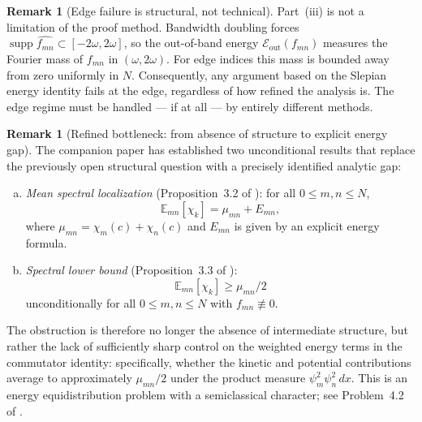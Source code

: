 \documentclass[12pt,a4paper]{amsart}
\theoremstyle{definition}
\newtheorem{remark}[theorem]{Remark}
\begin{document}
\begin{remark}[Edge failure is structural, not technical]\label{rem:edge-failure}
Part~(iii) is not a limitation of the proof method.
Bandwidth doubling forces $\operatorname{supp}\widehat{f_{mn}}\subset[-2\omega,2\omega]$,
so the out-of-band energy $\mathcal{E}_{\mathrm{out}}(f_{mn})$
measures the Fourier mass of $f_{mn}$ in $(\omega,2\omega)$.
For edge indices this mass is bounded away from zero uniformly in $N$.
Consequently, any argument based on the Slepian energy identity fails
at the edge, regardless of how refined the analysis is.
The edge regime must be handled --- if at all --- by entirely different methods.
\end{remark}

\begin{remark}[Refined bottleneck: from absence of structure to
explicit energy gap]\label{rem:bottleneck}
The companion paper \cite{PaperIII} has established two unconditional
results that replace the previously open structural question with
a precisely identified analytic gap:
\begin{enumerate}[(a)]
\item \emph{Mean spectral localization} (Proposition~3.2 of
  \cite{PaperIII}): for all $0\le m,n\le N$,
  \[
    \mathbb{E}_{mn}[\chi_k] = \mu_{mn} + E_{mn},
  \]
  where $\mu_{mn}=\chi_m(c)+\chi_n(c)$ and $E_{mn}$ is given
  by an explicit energy formula.
\item \emph{Spectral lower bound} (Proposition~3.3 of \cite{PaperIII}):
  \[
    \mathbb{E}_{mn}[\chi_k] \ge \mu_{mn}/2
  \]
  unconditionally for all $0\le m,n\le N$ with $f_{mn}\not\equiv0$.
\end{enumerate}
The obstruction is therefore no longer the absence of intermediate
structure, but rather the lack of sufficiently sharp control on the
weighted energy terms in the commutator identity:
specifically, whether the kinetic and potential contributions average
to approximately $\mu_{mn}/2$ under the product measure $\psi_m^2\psi_n^2\,dx$.
This is an energy equidistribution problem with a semiclassical character;
see Problem~4.2 of \cite{PaperIII}.
\end{remark}
\end{document}
